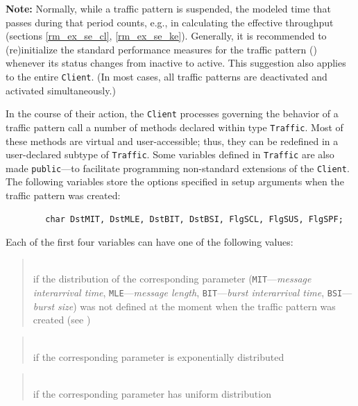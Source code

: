 \medskip

\noindent
{\bf Note:}
Normally,
while a traffic pattern is suspended, the modeled time that passes during
that period counts, e.g., in calculating the effective throughput
(sections \ref{rm_ex_se_cl}, \ref{rm_ex_se_ke}).
Generally, it is recommended to (re)initialize the standard performance
measures for the traffic pattern ()
whenever its status changes from inactive to active.
This suggestion also applies to the entire {\tt Client}.
(In most cases, all traffic patterns are deactivated and activated
simultaneously.)

\medskip

In the course of their action, the {\tt Client} processes
governing the behavior of a traffic pattern call a number of methods
declared within type {\tt Traffic}.
Most of these methods are virtual and user-accessible; thus, they can be
redefined in a user-declared subtype of {\tt Traffic}.
Some variables defined in {\tt Traffic} are also made {\tt public}---to
facilitate programming non-standard extensions of the {\tt Client}.
The following variables store the options specified
in setup arguments when the traffic pattern was created:
\begin{verbatim}
        char DstMIT, DstMLE, DstBIT, DstBSI, FlgSCL, FlgSUS, FlgSPF;
\end{verbatim}
Each of the first four variables can have one of the following values:

\medskip

\begin{quote}
\noindent{}\\ \hspace{0in}
if the distribution of the corresponding parameter
({\tt MIT}---{\em message
interarrival time}, {\tt MLE}---{\em message length},
{\tt BIT}---{\em burst interarrival time}, {\tt BSI}---{\em burst
size\/})
was not defined
at the moment when the traffic pattern was created (see )
\end{quote}

\begin{quote}
\noindent{}\\ \hspace{0in}
if the corresponding parameter is exponentially distributed
\end{quote}

\begin{quote}
\noindent{}\\ \hspace{0in}
if the corresponding parameter has uniform distribution
\end{quote}

